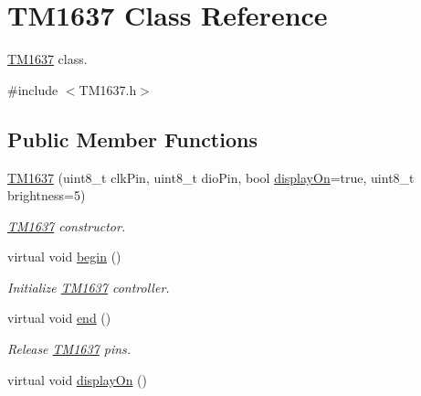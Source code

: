 \hypertarget{class_t_m1637}{}\section{T\+M1637 Class Reference}
\label{class_t_m1637}


\hyperlink{class_t_m1637}{T\+M1637} class.  




{\ttfamily \#include $<$T\+M1637.\+h$>$}

\subsection*{Public Member Functions}
\begin{DoxyCompactItemize}
\item 
\hyperlink{class_t_m1637_a670017ac81f233a90e0376c453ffde3e}{T\+M1637} (uint8\+\_\+t clk\+Pin, uint8\+\_\+t dio\+Pin, bool \hyperlink{class_t_m1637_a7e668bc225e6b2ee9f1b3097531277b2}{display\+On}=true, uint8\+\_\+t brightness=5)
\begin{DoxyCompactList}\small\item\em \hyperlink{class_t_m1637}{T\+M1637} constructor. \end{DoxyCompactList}\item 
virtual void \hyperlink{class_t_m1637_a78f17a3cc084024d7d1c8010d3c114be}{begin} ()\hypertarget{class_t_m1637_a78f17a3cc084024d7d1c8010d3c114be}{}\label{class_t_m1637_a78f17a3cc084024d7d1c8010d3c114be}

\begin{DoxyCompactList}\small\item\em Initialize \hyperlink{class_t_m1637}{T\+M1637} controller. \end{DoxyCompactList}\item 
virtual void \hyperlink{class_t_m1637_ac123b614c1154e1b6ceb42ae35026b34}{end} ()\hypertarget{class_t_m1637_ac123b614c1154e1b6ceb42ae35026b34}{}\label{class_t_m1637_ac123b614c1154e1b6ceb42ae35026b34}

\begin{DoxyCompactList}\small\item\em Release \hyperlink{class_t_m1637}{T\+M1637} pins. \end{DoxyCompactList}\item 
virtual void \hyperlink{class_t_m1637_a7e668bc225e6b2ee9f1b3097531277b2}{display\+On} ()\hypertarget{class_t_m1637_a7e668bc225e6b2ee9f1b3097531277b2}{}\label{class_t_m1637_a7e668bc225e6b2ee9f1b3097531277b2}


\end{DoxyCompactItemize}
